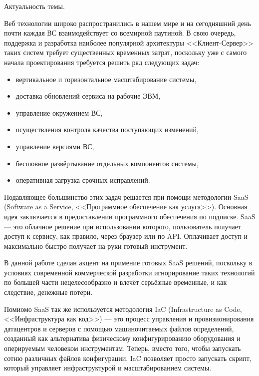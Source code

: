 \newpage

Актуальность темы.

Веб технологии широко распространились в нашем мире и на сегодняшний день почти каждая ВС взаимодействует со всемирной паутиной.
В свою очередь, поддержка и разработка наиболее популярной архитектуры <<Клиент-Сервер>> таких систем требует существенных временных затрат, поскольку уже с самого начала проектирования требуется решить ряд следующих задач:

\begin{itemize}
    \item вертикальное и горизонтальное масштабирование системы,
    \item доставка обновлений сервиса на рабочие ЭВМ,
    \item управление окружением ВС,
    \item осуществления контроля качества поступающих изменений,
    \item управление версиями ВС,
    \item бесшовное развёртывание отдельных компонентов системы,
    \item оперативная загрузка срочных исправлений.
\end{itemize}

Подавляющее большинство этих задач решается при помощи методологии SaaS (Software as a Service, <<Программное обеспечение как услуга>>).
Основная идея заключается в предоставлении программного обеспечения по подписке.
SaaS --- это облачное решение при использовании которого, пользователь получает доступ к сервису, как правило, через браузер или по API.
Оплачивает доступ и максимально быстро получает на руки готовый инструмент.

В данной работе сделан акцент на примение готовых SaaS решений, поскольку в условиях современной коммерческой разработки игнорирование таких
технологий по большей части нецелесообразно и влечёт серьёзные временные, и как следствие, денежные потери.

Помиомо SaaS так же используется методология IaC (Infrastructure as Code, <<Инфраструктура как код>>) --- это процесс управления и провизионирования датацентров и серверов с помощью машиночитаемых файлов определений,
созданный как альтернатива физическому конфигурированию оборудования и оперируемым человеком инструментам.
Теперь, вместо того, чтобы запускать сотню различных файлов конфигурации,
IaC позволяет просто запускать скрипт, который управляет инфраструктурой и масштабированием системы.

